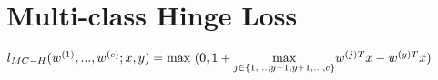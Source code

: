 \section*{Multi-class Hinge Loss}
$l_{MC-H}(w^{(1)},...,w^{(c)};x,y) =\\
\text{max }(0,1+\underset{j\in\{1,...,y-1,y+1,...,c\}}{\operatorname{max}} w^{(j)T} x - w^{(y)T} x)$
